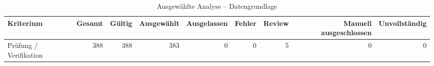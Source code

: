 \begin{table}[htbp]
\centering
\caption{Ausgewählte Analyse -- Datengrundlage}
\begin{tabular}{lrrrrrrrr}
\toprule
Kriterium & Gesamt & Gültig & Ausgewählt & Ausgelassen & Fehler & Review & Manuell ausgeschlossen & Unvollständig \\
\midrule
Prüfung / Verifikation & 388 & 388 & 383 & 0 & 0 & 5 & 0 & 0 \\
\bottomrule
\end{tabular}
\end{table}
